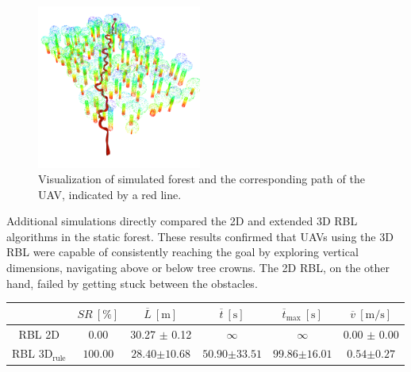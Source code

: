             \begin{figure}[H]
                \centering
                \includegraphics[width=0.48\textwidth]{./fig/rviz/simulation_forest.png}
                \caption{
                    Visualization of simulated forest and the corresponding path of the \ac{UAV}, indicated by a red line.
                }
                \label{fig:simulated_forest_path}
            \end{figure}

            Additional simulations directly compared the 2D and extended 3D \ac{RBL} algorithms in the static forest. 
            These results confirmed that \ac{UAV}s using the 3D \ac{RBL} were capable of consistently reaching the goal by exploring vertical dimensions, navigating above or below tree crowns. 
            The 2D \ac{RBL}, on the other hand, failed by getting stuck between the obstacles.
            \begin{table}[H]
                \centering
                \renewcommand{\arraystretch}{1.2}
                \begin{tabular}{|c|c|c|c|c|c|}
                \hline
                                                    & \( SR \ [\%] \)   & \( \overline{L} \ [\mathrm{m}] \)                & \( \overline{t} \ [\mathrm{s}] \)                & \( \overline{t}_{\text{max}} \ [\mathrm{s}] \)    &   \( \overline{v} \ [\mathrm{m/s}] \)     \\ \hline
                \ac{RBL} 2D                         & 0.00              & 30.27 $\pm$ 0.12                                 & $\infty$                                         &  $\infty$                                         &  0.00 $\pm$ 0.00                         \\ \hline
                \ac{RBL} $\text{3D}_{\text{rule}}$  & $\mathbf{100.00}$ & $\mathbf{28.40} \boldsymbol{\pm} \mathbf{10.68}$ & $\mathbf{50.90} \boldsymbol{\pm} \mathbf{33.51}$ &  $\mathbf{99.86} \boldsymbol{\pm} \mathbf{16.01}$ &  $\mathbf{0.54} \boldsymbol{\pm} \mathbf{0.27}$                         \\ \hline
                \end{tabular}
            \end{table}

